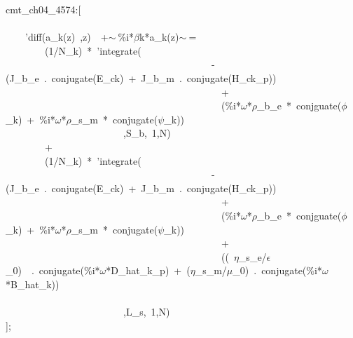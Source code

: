 \documentclass[fleqn]{article}
\begin{document}
\begin{minipage}[t]{\textwidth}\color{blue}
cmt\_ch04\_4574:[\\
\\
\ \ \ \ 'diff(a\_k(z)\ ,z)\ \ +\ensuremath{\sim\ }\%i*\ensuremath{\beta}k*a\_k(z)\ensuremath{\sim\ }=\ \\
\ \ \ \ \ \ \ \ (1/N\_k)\ *\ 'integrate(\ \\
\ \ \ \ \ \ \ \ \ \ \ \ \ \ \ \ \ \ \ \ \ \ \ \ \ \ \ \ \ \ \ \ \ \ \ \ \ \ \ \ \ \ -(J\_b\_e\ .\ conjugate(E\_ck)\ +\ J\_b\_m\ .\ conjugate(H\_ck\_p))\ \\
\ \ \ \ \ \ \ \ \ \ \ \ \ \ \ \ \ \ \ \ \ \ \ \ \ \ \ \ \ \ \ \ \ \ \ \ \ \ \ \ \ \ \ \ +\\
\ \ \ \ \ \ \ \ \ \ \ \ \ \ \ \ \ \ \ \ \ \ \ \ \ \ \ \ \ \ \ \ \ \ \ \ \ \ \ \ \ \ \ \ (\%i*\ensuremath{\omega}*\ensuremath{\rho}\_b\_e\ *\ conjguate(\ensuremath{\phi}\_k)\ +\ \%i*\ensuremath{\omega}*\ensuremath{\rho}\_s\_m\ *\ conjugate(\ensuremath{\psi}\_k))\ \\
\ \ \ \ \ \ \ \ \ \ \ \ \ \ \ \ \ \ \ \ \ \ \ \ ,S\_b,\ 1,N)\\
\ \ \ \ \ \ \ \ +\\
\ \ \ \ \ \ \ \ (1/N\_k)\ *\ 'integrate(\ \\
\ \ \ \ \ \ \ \ \ \ \ \ \ \ \ \ \ \ \ \ \ \ \ \ \ \ \ \ \ \ \ \ \ \ \ \ \ \ \ \ \ \ -(J\_b\_e\ .\ conjugate(E\_ck)\ +\ J\_b\_m\ .\ conjugate(H\_ck\_p))\ \\
\ \ \ \ \ \ \ \ \ \ \ \ \ \ \ \ \ \ \ \ \ \ \ \ \ \ \ \ \ \ \ \ \ \ \ \ \ \ \ \ \ \ \ \ +\\
\ \ \ \ \ \ \ \ \ \ \ \ \ \ \ \ \ \ \ \ \ \ \ \ \ \ \ \ \ \ \ \ \ \ \ \ \ \ \ \ \ \ \ \ (\%i*\ensuremath{\omega}*\ensuremath{\rho}\_b\_e\ *\ conjguate(\ensuremath{\phi}\_k)\ +\ \%i*\ensuremath{\omega}*\ensuremath{\rho}\_s\_m\ *\ conjugate(\ensuremath{\psi}\_k))\ \\
\ \ \ \ \ \ \ \ \ \ \ \ \ \ \ \ \ \ \ \ \ \ \ \ \ \ \ \ \ \ \ \ \ \ \ \ \ \ \ \ \ \ \ \ +\\
\ \ \ \ \ \ \ \ \ \ \ \ \ \ \ \ \ \ \ \ \ \ \ \ \ \ \ \ \ \ \ \ \ \ \ \ \ \ \ \ \ \ \ \ ((\ \ensuremath{\eta}\_s\_e/\ensuremath{\epsilon}\_0)\ \ .\ conjugate(\%i*\ensuremath{\omega}*D\_hat\_k\_p)\ +\ (\ensuremath{\eta}\_s\_m/\ensuremath{\mu}\_0)\ .\ conjugate(\%i*\ensuremath{\omega}*B\_hat\_k))\\
\\
\ \ \ \ \ \ \ \ \ \ \ \ \ \ \ \ \ \ \ \ \ \ \ \ ,L\_s,\ 1,N)\\
];\\

\end{minipage}
\end{document}
